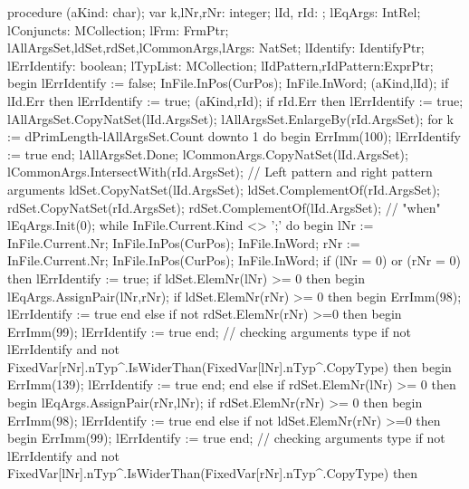 \nwenddocs{}\endmoddef\nwstartdeflinemarkup{}\nwenddeflinemarkup
procedure (aKind: char);
var
   k,lNr,rNr: integer;
   lId, rId: ;
   lEqArgs: IntRel;
   lConjuncts: MCollection;
   lFrm: FrmPtr;
   lAllArgsSet,ldSet,rdSet,lCommonArgs,lArgs: NatSet;
   lIdentify: IdentifyPtr;
   lErrIdentify: boolean;
   lTypList: MCollection;
   lIdPattern,rIdPattern:ExprPtr;
begin
   lErrIdentify := false;
   InFile.InPos(CurPos); InFile.InWord;
   (aKind,lId);
   if lId.Err then lErrIdentify := true;
   (aKind,rId);
   if rId.Err then lErrIdentify := true;
   lAllArgsSet.CopyNatSet(lId.ArgsSet);
   lAllArgsSet.EnlargeBy(rId.ArgsSet);
   for k := dPrimLength-lAllArgsSet.Count downto 1 do
   begin ErrImm(100); lErrIdentify := true end;
   lAllArgsSet.Done;
   lCommonArgs.CopyNatSet(lId.ArgsSet);
   lCommonArgs.IntersectWith(rId.ArgsSet);
   //  Left pattern and right pattern arguments
   ldSet.CopyNatSet(lId.ArgsSet); ldSet.ComplementOf(rId.ArgsSet);
   rdSet.CopyNatSet(rId.ArgsSet); rdSet.ComplementOf(lId.ArgsSet);
   // "when"
   lEqArgs.Init(0);
   while InFile.Current.Kind <> ';' do
   begin
      lNr := InFile.Current.Nr; InFile.InPos(CurPos); InFile.InWord;
      rNr := InFile.Current.Nr; InFile.InPos(CurPos); InFile.InWord;
      if (lNr = 0) or (rNr = 0) then
         lErrIdentify := true;
      if ldSet.ElemNr(lNr) >= 0 then
      begin
         lEqArgs.AssignPair(lNr,rNr);
         if ldSet.ElemNr(rNr) >= 0 then
         begin ErrImm(98); lErrIdentify := true end
         else if not rdSet.ElemNr(rNr) >=0 then
         begin ErrImm(99); lErrIdentify := true end;
         // checking arguments type
         if not lErrIdentify and
               not FixedVar[rNr].nTyp^.IsWiderThan(FixedVar[lNr].nTyp^.CopyType) then
         begin ErrImm(139); lErrIdentify := true end;
      end
      else if rdSet.ElemNr(lNr) >= 0 then
      begin
         lEqArgs.AssignPair(rNr,lNr);
         if rdSet.ElemNr(rNr) >= 0 then
         begin ErrImm(98); lErrIdentify := true end
         else if not ldSet.ElemNr(rNr) >=0 then
         begin ErrImm(99); lErrIdentify := true end;
         // checking arguments type
         if not lErrIdentify and
               not FixedVar[lNr].nTyp^.IsWiderThan(FixedVar[rNr].nTyp^.CopyType) then
